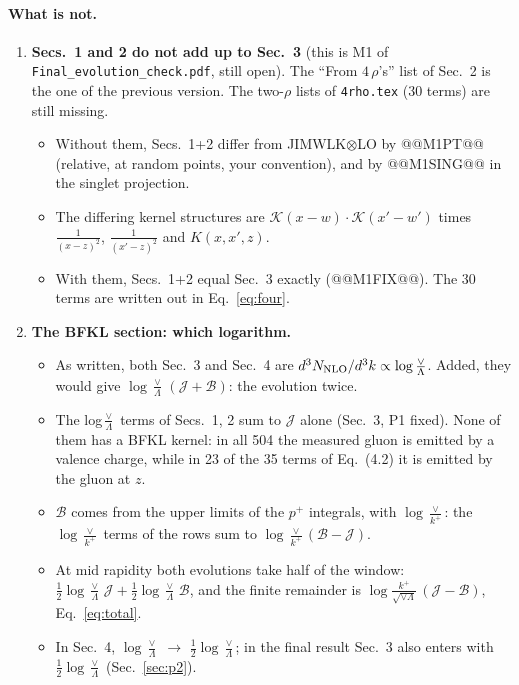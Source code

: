 \documentclass[10pt]{article}
\numberwithin{equation}{section}
\newcommand{\new}[1]{{\color{blue}#1}}
\newcommand{\old}[1]{{\color{red}#1}}
\begin{document}
\paragraph{What is not.}
\begin{enumerate}
\item[\textbf{P1}] \textbf{Secs.~1 and 2 do not add up to Sec.~3} (this is M1 of \texttt{Final\_evolution\_check.pdf}, still open). The ``From $4\,\rho$'s'' list of Sec.~2 is the one of the previous version. The two-$\rho$ lists of \texttt{4rho.tex} (30 terms) are still missing.
\begin{itemize}
\item Without them, Secs.~1+2 differ from JIMWLK$\otimes$LO by @@M1PT@@ (relative, at random points, your convention), and by @@M1SING@@ in the singlet projection.
\item The differing kernel structures are $\mathcal K(x-w)\cdot\mathcal K(x'-w')$ times $\frac{1}{(x-z)^2}$, $\frac{1}{(x'-z)^2}$ and $K(x,x',z)$.
\item With them, Secs.~1+2 equal Sec.~3 exactly (@@M1FIX@@). The 30 terms are written out in Eq.~\eqref{eq:four}.
\end{itemize}
\item[\textbf{P2}] \textbf{The BFKL section: which logarithm.}
\begin{itemize}
\item As written, both Sec.~3 and Sec.~4 are $d^3N_{\rm NLO}/d^3k\propto\log\frac{\vee}{\Lambda}$. Added, they would give $\log\frac{\vee}{\Lambda}\,(\mathcal J+\mathcal B)$: the evolution twice.
\item The log$\frac{\vee}{\Lambda}$ terms of Secs.~1, 2 sum to $\mathcal J$ alone (Sec.~3, P1 fixed). None of them has a BFKL kernel: in all 504 the measured gluon is emitted by a valence charge, while in 23 of the 35 terms of Eq.~(4.2) it is emitted by the gluon at $z$.
\item $\mathcal B$ comes from the upper limits of the $p^+$ integrals, with $\log\frac{\vee}{k^+}$: the $\log\frac{\vee}{k^+}$ terms of the rows sum to $\log\frac{\vee}{k^+}(\mathcal B-\mathcal J)$.
\item At mid rapidity both evolutions take half of the window: $\frac12\log\frac{\vee}{\Lambda}\,\mathcal J+\frac12\log\frac{\vee}{\Lambda}\,\mathcal B$, and the finite remainder is $\log\frac{k^+}{\sqrt{\vee\Lambda}}\,(\mathcal J-\mathcal B)$, Eq.~\eqref{eq:total}.
\item In Sec.~4, \old{$\log\frac{\vee}{\Lambda}$} $\to$ \new{$\frac12\log\frac{\vee}{\Lambda}$}; in the final result Sec.~3 also enters with $\frac12\log\frac{\vee}{\Lambda}$ (Sec.~\ref{sec:p2}).

\end{itemize}
\end{enumerate}
\end{document}

